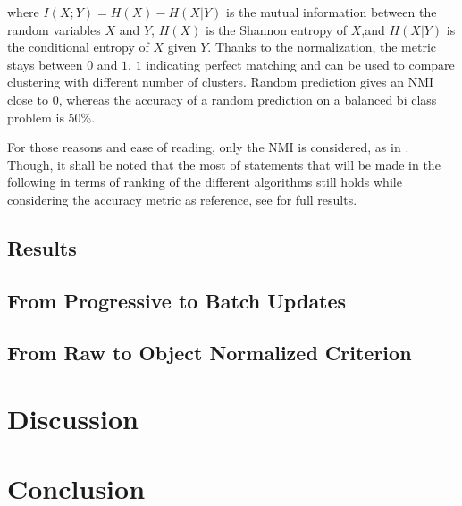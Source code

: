 \documentclass[a4paper,twoside]{article}
\begin{document}
where $I(X;Y)=H(X)−H(X|Y)$ is the mutual information between the random variables $X$ and $Y$, $H(X)$ is the Shannon entropy of $X$,and $H(X|Y)$ is the conditional entropy of $X$ given $Y$. Thanks to the normalization, the metric stays between $0$ and $1$, $1$ indicating perfect matching and can be used to compare clustering with different number of clusters. Random prediction gives an NMI close to $0$, whereas the accuracy of a random prediction on a balanced bi class problem is 50\%.

For those reasons and ease of reading, only the NMI is considered, as in \cite{Kulis2008}. Though, it shall be noted that the most of statements that will be made in the following in terms of ranking of the different algorithms  still holds while considering the accuracy metric as reference, see \url{} for full results.

\subsection{Results}





\subsection{From Progressive to Batch Updates}

\subsection{From Raw to Object Normalized Criterion}


\section{Discussion}

\section{Conclusion}




\appendix


\end{document}
